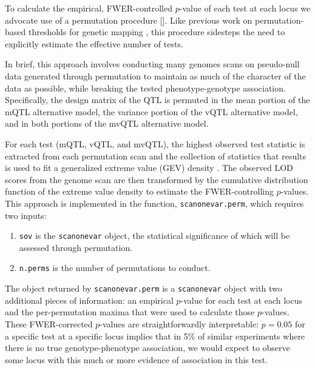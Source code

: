 \documentclass[9pt,twocolumn,twoside]{gsag3jnl}
\begin{document}
To calculate the empirical, FWER-controlled $p$-value of each test at each locus we advocate use of a permutation procedure [\CortyMethodsPaper].
Like previous work on permutation-based thresholds for genetic mapping \citep{Churchill1994,Carlborg2002}, this procedure sidesteps the need to explicitly estimate the effective number of tests.

In brief, this approach involves conducting many genomes scans on pseudo-null data generated through permutation to maintain as much of the character of the data as possible, while breaking the tested phenotype-genotype association.
Specifically, the design matrix of the QTL is permuted in the mean portion of the mQTL alternative model, the variance portion of the vQTL alternative model, and in both portions of the mvQTL alternative model.

For each test (mQTL, vQTL, and mvQTL), the highest observed test statistic is extracted from each permutation scan and the collection of statistics that results is used to fit a generalized extreme value (GEV) density \citep{Stephenson2002,Dudbridge2004,Valdar06cc}.
The observed LOD scores from the genome scan are then transformed by the cumulative distribution function of the extreme value density to estimate the FWER-controlling $p$-values.
This approach is implemented in the function, \texttt{scanonevar.perm}, which requires two inputs:
\begin{enumerate}
	\item \texttt{sov} is the \texttt{scanonevar} object, the statistical significance of which will be assessed through permutation.
	\item \texttt{n.perms} is the number of permutations to conduct.
\end{enumerate}
The object returned by \texttt{scanonevar.perm} is a \texttt{scanonevar} object with two additional pieces of information: an empirical $p$-value for each test at each locus and the per-permutation maxima that were used to calculate those $p$-values.
These FWER-corrected $p$-values are straightforwardly interpretable: $p = 0.05$ for a specific test at a specific locus implies that in 5\% of similar experiments where there is no true genotype-phenotype association, we would expect to observe some locus with this much or more evidence of association in this test.
\end{document}
